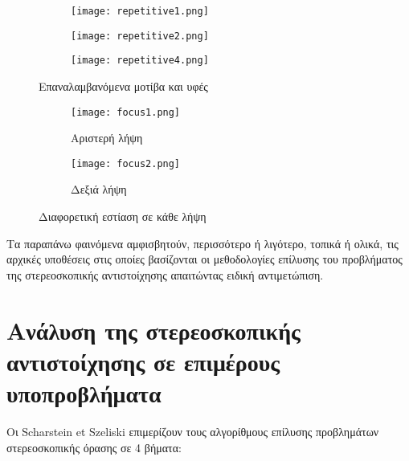 \begin{figure}
	\centering
	\begin{subfigure}{.3\textwidth}
		\texttt{[image: repetitive1.png]}
	\end{subfigure}
	\begin{subfigure}{.3\textwidth}
		\texttt{[image: repetitive2.png]}
	\end{subfigure}
	\begin{subfigure}{.3\textwidth}
		\texttt{[image: repetitive4.png]}
	\end{subfigure}
	\caption{Επαναλαμβανόμενα μοτίβα και υφές}
	\label{fig:repetitive}
\end{figure}

\begin{figure}
	\centering
	\begin{subfigure}{.49\textwidth}
		\texttt{[image: focus1.png]}
		\caption{Αριστερή λήψη}
	\end{subfigure}
	\begin{subfigure}{.49\textwidth}
		\texttt{[image: focus2.png]}
		\caption{Δεξιά λήψη}
	\end{subfigure}
	\caption{Διαφορετική εστίαση σε κάθε λήψη}
	\label{fig:different_focus}
\end{figure}

Τα παραπάνω φαινόμενα αμφισβητούν, περισσότερο ή λιγότερο, τοπικά ή ολικά, τις αρχικές υποθέσεις στις οποίες βασίζονται οι μεθοδολογίες επίλυσης του προβλήματος της στερεοσκοπικής αντιστοίχησης απαιτώντας ειδική αντιμετώπιση.


\section{Ανάλυση της στερεοσκοπικής αντιστοίχησης σε επιμέρους υποπροβλήματα}

Οι \e Scharstein et Szeliski \g \citep{in2002taxonomy} επιμερίζουν τους αλγορίθμους επίλυσης προβλημάτων στερεοσκοπικής όρασης σε 4 βήματα:

